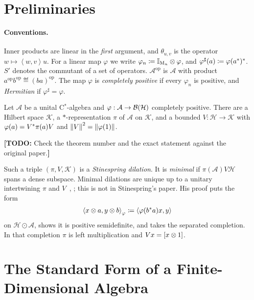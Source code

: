 \documentclass[12pt]{article}
\newcommand{\todo}[1]{\textcolor{\mysubcolor}{\small\textbf{[TODO:} #1\textbf{]}}}
\newcommand{\alg}{\mathcal{A}}             %
\newcommand{\hilb}{\mathcal{H}}            %
\newcommand{\dil}{\mathcal{K}}             %
\newcommand{\bdd}[1]{\mathcal{B}\br{#1}}   %
\newcommand{\Mn}[1]{\mathrm{M}_{#1}}       %
\newcommand{\algtensor}{\odot}             %
\newcommand{\op}{^{\mathrm{op}}}           %
\newcommand{\ip}[2]{\left\langle #1 , #2 \right\rangle}
\newcommand{\ipphi}[2]{\left\langle #1 , #2 \right\rangle_{\varphi}}
\newcommand{\rankone}[2]{\theta_{#1, #2}}  %
\begin{document}
\section{Preliminaries}
\label{sec:prelim}

\paragraph{Conventions.}
Inner products are linear in the \emph{first} argument, and \(\rankone{u}{v}\) is
the operator \(w \mapsto \ip{w}{v}u\). For a linear map \(\varphi\) we write
\(\varphi_n \eqdef \id_{\Mn{n}} \tensor \varphi\), and
\(\varphi^\sharp(a) \coloneqq \varphi(a^*)^*\). \(S'\) denotes the
commutant of a set of operators. \(\alg\op\) is \(\alg\) with product
\(a\op b\op \eqdef (ba)\op\). The map \(\varphi\) is \emph{completely positive} if
every \(\varphi_n\) is positive, and \emph{Hermitian} if \(\varphi^\sharp = \varphi\).

\begin{theorem}
\label{thm:stinespring}
Let \(\alg\) be a unital C\(^*\)-algebra and \(\varphi : \alg \to \bdd{\hilb}\)
completely positive. There are a Hilbert space \(\dil\), a \(*\)-representation
\(\pi\) of \(\alg\) on \(\dil\), and a bounded \(V : \hilb \to \dil\) with
\(\varphi(a) = V^*\pi(a)V\) and \(\left\| V \right\|^2 = \left\| \varphi(1) \right\|\).
\end{theorem}
\todo{Check the theorem number and the exact statement against the original
paper.}

Such a triple \((\pi, V, \dil)\) is a \emph{Stinespring dilation}. It is
\emph{minimal} if \(\pi(\alg)V\hilb\) spans a dense subspace. Minimal dilations
are unique up to a unitary intertwining \(\pi\) and \(V\)~\cite{Arveson1969},
\cite[Chapter~4]{Paulsen2002}; this is not in Stinespring's paper. His proof
puts the form
\begin{equation}
\label{eq:form}
  \ipphi{x \tensor a}{y \tensor b} \eqdef \ip{\varphi(b^\adjoint a)x}{y}
\end{equation}
on \(\hilb \algtensor \alg\), shows it is positive semidefinite, and takes the
separated completion. In that completion \(\pi\) is left multiplication and
\(Vx = [x \otimes 1]\).

\section{The Standard Form of a Finite-Dimensional Algebra}
\label{sec:standard}
\end{document}
